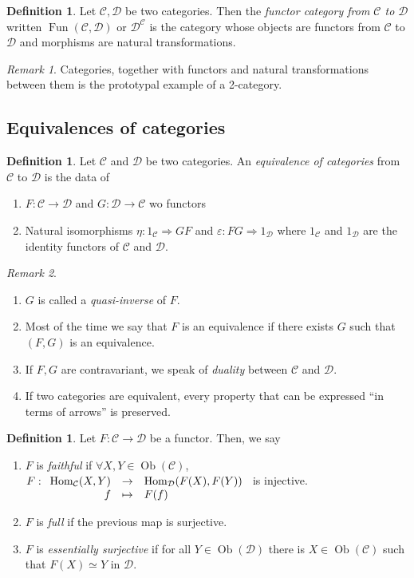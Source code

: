 \documentclass{article}
\newcommand{\cat}{\mathcal{C}}
\newcommand{\catt}{\mathcal{D}}
\DeclareMathOperator{\Ob}{Ob}
\DeclareMathOperator{\Hom}{Hom}
\DeclareMathOperator{\Fun}{Fun}
\renewcommand{\epsilon}{\varepsilon}
\newcommand{\applic}[4]{\begin{array}[t]{rcl}
#1 & \to & #2 \\
#3 & \mapsto & #4
\end{array}}
\theoremstyle{plain}
\theoremstyle{definition}
\newtheorem{definition}[theorem]{Definition}
\theoremstyle{remark}
\newtheorem*{remark}{Remark}
\begin{document}
\begin{definition}
    Let $\cat,\catt$ be two categories. Then the \emph{functor category from $\cat$ to $\catt$} written $\Fun(\cat,\catt)$ or $\catt^\cat$ is the category whose objects are functors from $\cat$ to $\catt$ and morphisms are natural transformations.
\end{definition}

\begin{remark}
    Categories, together with functors and natural transformations between them is the prototypal example of a 2-category.
\end{remark}

\subsection{Equivalences of categories}

\begin{definition}
    Let $\cat$ and $\catt$ be two categories. An \emph{equivalence of categories} from $\cat$ to $\catt$ is the data of
    \begin{enumerate}
        \item $F : \cat \to \catt$ and $G : \catt \to \cat$ wo functors
        \item Natural isomorphisms $\eta : 1_\cat \Rightarrow GF$ and $\epsilon : FG \Rightarrow 1_\catt$ where $1_\cat$ and $1_\catt$ are the identity functors of $\cat$ and $\catt$.
    \end{enumerate}
\end{definition}

\begin{remark} \leavevmode
    \begin{enumerate}
        \item $G$ is called a \emph{quasi-inverse} of $F$.
        \item Most of the time we say that $F$ is an equivalence if there exists $G$ such that $(F,G)$ is an equivalence.
        \item If $F,G$ are contravariant, we speak of \emph{duality} between $\cat$ and $\catt$.
        \item If two categories are equivalent, every property that can be expressed ``in terms of arrows'' is preserved.
    \end{enumerate}
\end{remark}

\begin{definition}
    Let $F : \cat \to \catt$ be a functor. Then, we say
    \begin{enumerate}
        \item $F$ is \emph{faithful} if $\forall X,Y \in \Ob(\cat)$, $F : \applic{\Hom_\cat(X,Y)}{\Hom_\catt(F(X),F(Y))}{f}{F(f)}$ is injective.
        \item $F$ is \emph{full} if the previous map is surjective.
        \item $F$ is \emph{essentially surjective} if for all $ Y \in \Ob(\catt)$ there is $X \in \Ob(\cat)$ such that $F(X) \simeq Y$ in $\catt$.
    \end{enumerate}
\end{definition}
\end{document}
